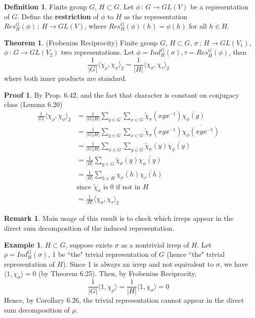 \documentclass{book}
\newcommand{\define}[1]{\textbf{#1}}
\newcommand{\inner}[1]{\langle #1 \rangle}
\newcommand{\abs}[1]{\lvert #1 \rvert }
\theoremstyle{definition}
\newtheorem{theorem}[lemma]{Theorem}
\newtheorem{definition}[lemma]{Definition}
\theoremstyle{remarkstyle}
\newtheorem*{remark}{Remark}%
\newtheorem*{example}{Example}%
\newtheorem*{myproof}{Proof}%
\begin{document}
\begin{definition}
    Finite group $G$, $H\subset G$. Let $\phi\,:\, G\rightarrow GL(V)$ be a representation of $G$. Define the \define{restriction} of $\phi$ to $H$ as the representation $Res^G_H(\phi)\,:\,H\rightarrow GL(V)$, where $Res^G_H(\phi)(h)=\phi(h)$ for all $h\in H$. \newline
\end{definition}

\begin{theorem}
    (Frobenius Reciprocity)\newline
    Finite group $G$, $H\subset G$, $\sigma\,:\,H\rightarrow GL(V_1)$, $\phi\,:\,G\rightarrow GL(V_2)$ two representations. Let $\phi=Ind^G_H(\sigma), \tau=Res^G_H(\phi)$, then 
    $$
    \frac{1}{\abs{G}}\inner{\chi_\rho, \chi_\phi}_2 = \frac{1}{\abs{H}}\inner{\chi_\sigma,\chi_\tau}_2
    $$
    where both inner products are standard. 
\end{theorem}
\begin{myproof}
By Prop. 6.42, and the fact that character is constant on conjugacy class (Lemma 6.20)
    \begin{align*}
        \frac{1}{\abs{G}}\inner{\chi_\rho, \chi_\phi}_2 
        &= \frac{1}{\abs{G}\abs{H}}\sum_{g\in G}\sum_{x\in G}\tilde{\chi}_\sigma(xgx^{-1})\overline{\chi_\phi(g)} \\
        &= \frac{1}{\abs{G}\abs{H}}\sum_{g\in G}\sum_{x\in G}\tilde{\chi}_\sigma(xgx^{-1})\overline{\chi_\phi(xgx^{-1})} \\
        &=  \frac{1}{\abs{G}\abs{H}}\sum_{x\in G}\sum_{y\in G}\tilde{\chi}_\sigma(y)\overline{\chi_\phi(y)} \\
        &= \frac{1}{\abs{H}}\sum_{y\in G}\tilde{\chi}_\sigma(y)\overline{\chi_\phi(y)} \\
        &= \frac{1}{\abs{H}}\sum_{h\in H}\chi_\sigma(h)\overline{\chi_\tau(h)} \\
        &\textrm{since $\tilde{\chi}_\sigma$ is 0 if not in $H$} \\
        &= \frac{1}{\abs{H}}\inner{\chi_\sigma,\chi_\tau}_2
    \end{align*}
    \newline 
\end{myproof}

\begin{remark}
    Main usage of this result is to check which irreps appear in the direct sum decomposition of the induced representation. 
\end{remark}
\begin{example}
    $H\subset G$, suppose exists $\sigma$ as a nontrivial irrep of $H$. Let $\rho=Ind^G_H(\sigma)$, 1 be ``the" trivial representation of $G$ (hence ``the" trivial representation of $H$). Since 1 is always an irrep and not equivalent to $\sigma$, we have $\inner{1,\chi_\sigma}=0$ (by Theorem 6.25). Then, by Frobenius Reciprocity,
    $$
    \frac{1}{\abs{G}}\inner{1,\chi_\rho} = \frac{1}{\abs{H}}\inner{1,\chi_\sigma}=0
    $$
    Hence, by Corollary 6.26, the trivial representation cannot appear in the direct sum decomposition of $\rho$.
\end{example}
\end{document}

